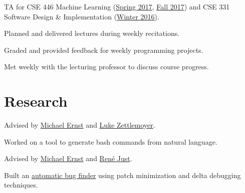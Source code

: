 \documentclass[]{deedy-resume}
\begin{document}
\begin{minipage}[t]{0.66\textwidth}
\begin{tightemize}
  \item TA for CSE 446 Machine Learning (\href{https://courses.cs.washington.edu/courses/cse446/17sp/}{Spring 2017}, \href{https://courses.cs.washington.edu/courses/cse446/17au/}{Fall 2017}) and CSE 331 Software Design \& Implementation (\href{https://courses.cs.washington.edu/courses/cse331/16wi/}{Winter 2016}).
  \item Planned and delivered lectures during weekly recitations.
  \item Graded and provided feedback for weekly programming projects.
  \item Met weekly with the lecturing professor to discuss course progress.
\end{tightemize}
\sectionsep


\section{Research}
\begin{tightemize}
\item Advised by \href{https://homes.cs.washington.edu/~mernst/}{Michael Ernst} and
\href{https://www.cs.washington.edu/people/faculty/lsz}{Luke Zettlemoyer}.
\item Worked on a tool to generate bash commands from natural language.
\end{tightemize}
\sectionsep

\begin{tightemize}
\item Advised by \href{https://homes.cs.washington.edu/~mernst/}{Michael Ernst} and
\href{https://people.cs.umass.edu/~rjust/}{Ren{\'e} Just}.
\item Built an \href{https://github.com/dericp/patch-minimization}{automatic bug finder} using patch minimization and delta debugging techniques.
\end{tightemize}
\sectionsep


\end{minipage}
\end{document}
